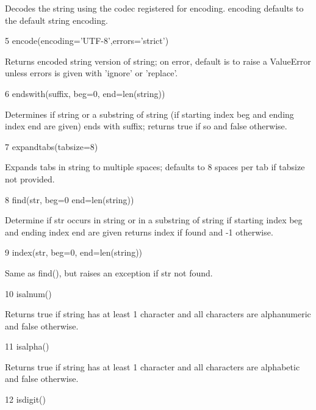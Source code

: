 Decodes the string using the codec registered for encoding. encoding defaults to the default string encoding. \par
5 \hspace*{0.5in} encode(encoding='UTF-8',errors='strict') \par
\vspace{12pt}
Returns encoded string version of string; on error, default is to raise a ValueError unless errors is given with 'ignore' or 'replace'. \par
6 \hspace*{0.5in} endswith(suffix, beg=0, end=len(string)) \par
Determines if string or a substring of string (if starting index beg and ending index end are given) ends with suffix; returns true if so and false otherwise. \par
7 \hspace*{0.5in} expandtabs(tabsize=8) \par
\vspace{12pt}
Expands tabs in string to multiple spaces; defaults to 8 spaces per tab if tabsize not provided. \par
8 \hspace*{0.5in} find(str, beg=0 end=len(string)) \par
\vspace{12pt}
Determine if str occurs in string or in a substring of string if starting index beg and ending index end are given returns index if found and -1 otherwise. \par
9 \hspace*{0.5in} index(str, beg=0, end=len(string)) \par
\vspace{12pt}
Same as find(), but raises an exception if str not found. \par
10 \hspace*{0.5in} isalnum() \par
\vspace{12pt}
Returns true if string has at least 1 character and all characters are alphanumeric and false otherwise. \par
11 \hspace*{0.5in} isalpha() \par
\vspace{12pt}
Returns true if string has at least 1 character and all characters are alphabetic and false otherwise. \par
12 \hspace*{0.5in} isdigit() \par

